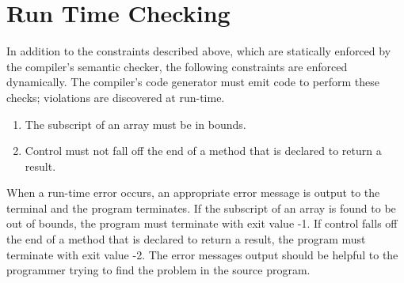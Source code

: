 \documentclass[11pt]{article}
\begin{document}
\section{Run Time Checking}

In addition to the constraints described above, which are statically enforced by the compiler's semantic checker, the following constraints are enforced dynamically.
The compiler's code generator must emit code to perform these checks; violations are discovered at run-time.

\begin{enumerate}
\item The subscript of an array must be in bounds.
\item Control must not fall off the end of a method that is declared to return a result.
\end{enumerate}

When a run-time error occurs, an appropriate error message is output to the terminal and the program terminates.
If the subscript of an array is found to be out of bounds, the program must terminate with exit value -1.
If control falls off the end of a method that is declared to return a result, the program must terminate with exit value -2.
The error messages output should be helpful to the programmer trying to find the problem in the source program.
\end{document}
